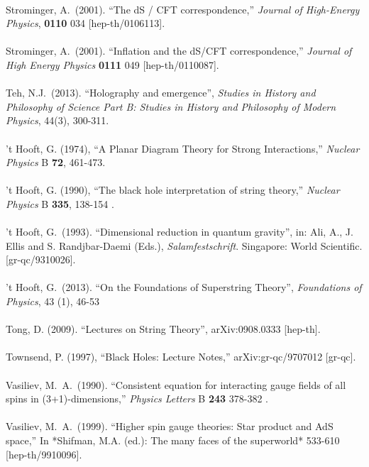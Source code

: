 \documentclass[12pt]{article}
\renewcommand{\^}[1]{\hat{#1}}
\begin{document}
\\
Strominger, A.~(2001). ``The dS / CFT correspondence,''
  {\it Journal of High-Energy Physics}, {\bf 0110} 034
  [hep-th/0106113].\\
\\
Strominger, A.~(2001). ``Inflation and the dS/CFT correspondence,''
  {\it Journal of High Energy Physics} {\bf 0111}  049
  [hep-th/0110087].\\
\\
Teh, N.J.~(2013). ``Holography and emergence'', \emph{Studies in History and Philosophy of Science Part B: Studies in History and Philosophy of Modern Physics}, 44(3), 300-311.\\
\\
't Hooft, G. (1974), ``A Planar Diagram Theory for Strong Interactions,''
  {\it Nuclear Physics} B {\bf 72}, 461-473.\\
\\
't Hooft, G. (1990), ``The black hole interpretation of string theory,''
  {\it Nuclear Physics} B {\bf 335}, 138-154 .\\
\\
't Hooft, G.~(1993). ``Dimensional reduction in quantum gravity'', in: Ali, A., J. Ellis and S. Randjbar-Daemi (Eds.), \emph{Salamfestschrift}. Singapore: World Scientific. [gr-qc/9310026].\\
\\
't Hooft, G.~(2013). ``On the Foundations of Superstring Theory'', {\it Foundations of Physics}, 43 (1), 46-53\\ 
\\
Tong, D. (2009). ``Lectures on String Theory'', arXiv:0908.0333 [hep-th].\\
\\
Townsend, P. (1997), ``Black Holes: Lecture Notes,'' arXiv:gr-qc/9707012 [gr-qc].\\
\\
Vasiliev, M.~A.~(1990). ``Consistent equation for interacting gauge fields of all spins in (3+1)-dimensions,''
 {\it Physics Letters} B {\bf 243} 378-382 .\\
\\
Vasiliev, M.~A.~(1999). ``Higher spin gauge theories: Star product and AdS space,''
  In *Shifman, M.A. (ed.): The many faces of the superworld* 533-610
  [hep-th/9910096].\\
\end{document}
